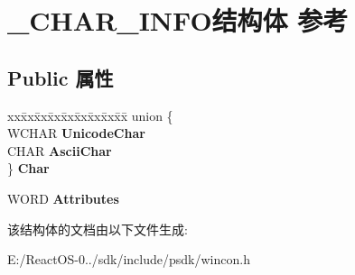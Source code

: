 \hypertarget{struct___c_h_a_r___i_n_f_o}{}\section{\+\_\+\+C\+H\+A\+R\+\_\+\+I\+N\+F\+O结构体 参考}
\label{struct___c_h_a_r___i_n_f_o}
\subsection*{Public 属性}
\begin{DoxyCompactItemize}
\item 
\mbox{\label{struct___c_h_a_r___i_n_f_o_aaffbc27bd961d049f4646a65f43dda3f}} 
\begin{tabbing}
xx\=xx\=xx\=xx\=xx\=xx\=xx\=xx\=xx\=\kill
union \{\\
\>WCHAR {\bfseries UnicodeChar}\\
\>CHAR {\bfseries AsciiChar}\\
\} {\bfseries Char}\\

\end{tabbing}\item 
\mbox{\label{struct___c_h_a_r___i_n_f_o_aa53b1f373fda79405229199bd878c69e}} 
W\+O\+RD {\bfseries Attributes}
\end{DoxyCompactItemize}


该结构体的文档由以下文件生成\+:\begin{DoxyCompactItemize}
\item 
E\+:/\+React\+O\+S-\/0../sdk/include/psdk/wincon.\+h\end{DoxyCompactItemize}
